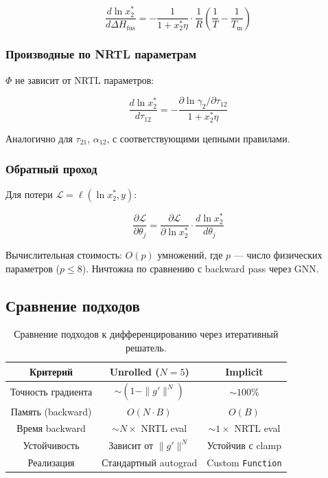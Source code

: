\documentclass[11pt]{article}
\begin{document}
\begin{equation*}
\frac{d\ln x_2^{*}}{d\Delta H_{\mathrm{fus}}} = -\frac{1}{1 + x_2^{*}\eta} \cdot \frac{1}{R}\!\left(\frac{1}{T} - \frac{1}{T_{\mathrm{m}}}\right)
\end{equation*}

\subsubsection{Производные по NRTL параметрам}

$\Phi$ не зависит от NRTL параметров:

\begin{equation*}
\frac{d\ln x_2^{*}}{d\tau_{12}} = -\frac{\partial \ln \gamma_2 / \partial \tau_{12}}{1 + x_2^{*}\eta}
\end{equation*}

Аналогично для $\tau_{21}$, $\alpha_{12}$, с соответствующими цепными правилами.

\subsubsection{Обратный проход}

Для потери $\mathcal{L} = \ell(\ln x_2^{*}, y)$:

\begin{equation*}
\frac{\partial \mathcal{L}}{\partial \theta_j} = \frac{\partial \mathcal{L}}{\partial \ln x_2^{*}} \cdot \frac{d\ln x_2^{*}}{d\theta_j}
\end{equation*}

Вычислительная стоимость: $O(p)$ умножений, где $p$ --- число физических параметров ($p \leq 8$). Ничтожна по сравнению с backward pass через GNN.

\subsection{Сравнение подходов}

\begin{table}[H]
\centering
\begin{tabular}{|c|c|c|}
\hline
Критерий & Unrolled ($N = 5$) & Implicit \\
\hline
Точность градиента & $\sim (1 - \|g'\|^N)$ & $\sim 100\%$ \\
\hline
Память (backward) & $O(N \cdot B)$ & $O(B)$ \\
\hline
Время backward & $\sim N \times$ NRTL eval & $\sim 1 \times$ NRTL eval \\
\hline
Устойчивость & Зависит от $\|g'\|^N$ & Устойчив с clamp \\
\hline
Реализация & Стандартный autograd & Custom \texttt{Function} \\
\hline
\end{tabular}
\caption{Сравнение подходов к дифференцированию через итеративный решатель.}
\end{table}
\end{document}
